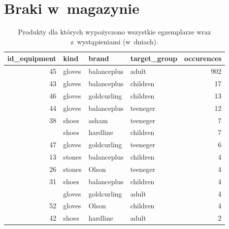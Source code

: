 \documentclass{mwart}\usepackage[]{graphicx}\usepackage[]{xcolor}
\newenvironment{knitrout}{}{} %
\begin{document}
\FloatBarrier
\appendix
\section {Braki w magazynie}\label {depleted}
\begin{knitrout}
\color{fgcolor}\begin{table}

\caption{\label{tab:depleted}Produkty dla których wypożyczono wszystkie egzemplarze wraz z wystąpieniami (w dniach).}
\centering
\begin{tabular}[t]{rlllr}
\toprule
id\_equipment & kind & brand & target\_group & occurences\\
\midrule
45 & gloves & balanceplus & adult & 902\\
43 & gloves & balanceplus & children & 17\\
46 & gloves & goldcurling & children & 13\\
44 & gloves & balanceplus & teeneger & 12\\
38 & shoes & asham & teeneger & 7\\
\addlinespace
40 & shoes & hardline & children & 7\\
47 & gloves & goldcurling & teeneger & 6\\
13 & stones & balanceplus & children & 4\\
26 & stones & Olson & teeneger & 4\\
31 & shoes & balanceplus & children & 4\\
\addlinespace
48 & gloves & goldcurling & adult & 4\\
52 & gloves & Olson & children & 4\\
42 & shoes & hardline & adult & 2\\
\bottomrule
\end{tabular}
\end{table}

\end{knitrout}
\end{document}
